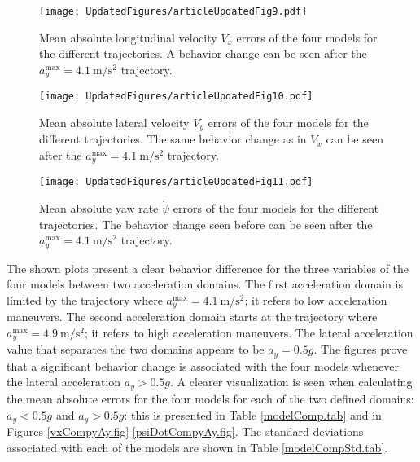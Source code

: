 \documentclass[journal]{IEEEtran}
\begin{document}
\begin{figure}[h]
    \centering
    \texttt{[image: UpdatedFigures/articleUpdatedFig9.pdf]}
    \caption{Mean absolute longitudinal velocity $V_x$ errors of the four models for the different trajectories. A behavior change can be seen after the $a_y^{\text{max}}=\SI{4.1}{\meter\per\second\squared}$ trajectory.}
    \label{vxComp.fig}
\end{figure}
\begin{figure}[h]
    \centering
    \texttt{[image: UpdatedFigures/articleUpdatedFig10.pdf]}
    \caption{Mean absolute lateral velocity $V_y$ errors of the four models for the different trajectories. The same behavior change as in $V_x$ can be seen after the $a_y^{\text{max}}=\SI{4.1}{\meter\per\second\squared}$ trajectory.}
    \label{vyComp.fig}
\end{figure}
\begin{figure}[h]
    \centering
    \texttt{[image: UpdatedFigures/articleUpdatedFig11.pdf]}
    \caption{Mean absolute yaw rate $\dot\psi$ errors of the four models for the different trajectories. The behavior change seen before can be seen after the $a_y^{\text{max}}=\SI{4.1}{\meter\per\second\squared}$ trajectory.}
    \label{psiDotComp.fig}
\end{figure}

The shown plots present a clear behavior difference for the three variables of the four models between two acceleration domains. The first acceleration domain is limited by the trajectory where $a_y^{\text{max}}=\SI{4.1}{\meter\per\second\squared}$; it refers to low acceleration maneuvers. The second acceleration domain starts at the trajectory where $a_y^{\text{max}}=\SI{4.9}{\meter\per\second\squared}$; it refers to high acceleration maneuvers. The lateral acceleration value that separates the two domains appears to be $a_y=0.5g$. The figures prove that a significant behavior change is associated with the four models whenever the lateral acceleration $a_y>0.5g$. A clearer visualization is seen when calculating the mean absolute errors for the four models for each of the two defined domains: $a_y<0.5g$ and $a_y>0.5g$: this is presented in Table \mbox{\ref{modelComp.tab}} and in Figures \mbox{\ref{vxCompyAy.fig}}-\mbox{\ref{psiDotCompyAy.fig}}. The standard deviations associated with each of the models are shown in Table \mbox{\ref{modelCompStd.tab}}.
\end{document}
